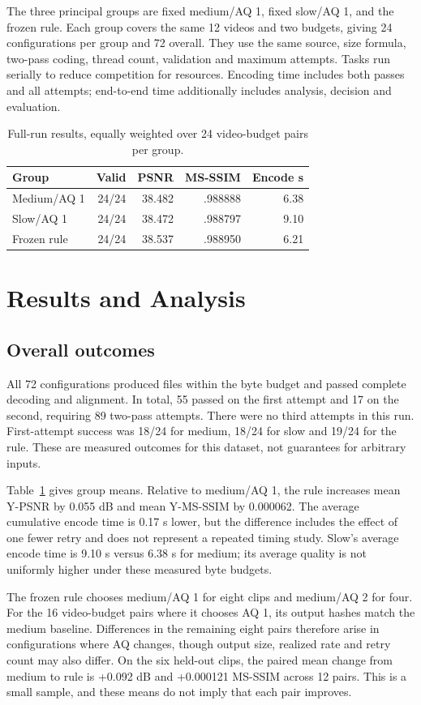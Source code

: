 \documentclass[conference]{IEEEtran}
\begin{document}
The three principal groups are fixed medium/AQ 1, fixed slow/AQ 1, and the frozen rule. Each group covers the same 12 videos and two budgets, giving 24 configurations per group and 72 overall. They use the same source, size formula, two-pass coding, thread count, validation and maximum attempts. Tasks run serially to reduce competition for resources. Encoding time includes both passes and all attempts; end-to-end time additionally includes analysis, decision and evaluation.
\begin{table}[H]\centering\caption{Full-run results, equally weighted over 24 video-budget pairs per group.}\label{tab:summary}
\begin{tabular}{lrrrr}\toprule
Group & Valid & PSNR & MS-SSIM & Encode s\\\midrule
Medium/AQ 1 & 24/24 & 38.482 & .988888 & 6.38\\
Slow/AQ 1 & 24/24 & 38.472 & .988797 & 9.10\\
Frozen rule & 24/24 & 38.537 & .988950 & 6.21\\\bottomrule
\end{tabular}\end{table}
\section{Results and Analysis}
\subsection{Overall outcomes}
All 72 configurations produced files within the byte budget and passed complete decoding and alignment. In total, 55 passed on the first attempt and 17 on the second, requiring 89 two-pass attempts. There were no third attempts in this run. First-attempt success was 18/24 for medium, 18/24 for slow and 19/24 for the rule. These are measured outcomes for this dataset, not guarantees for arbitrary inputs.

Table~\ref{tab:summary} gives group means. Relative to medium/AQ 1, the rule increases mean Y-PSNR by 0.055 dB and mean Y-MS-SSIM by 0.000062. The average cumulative encode time is 0.17 s lower, but the difference includes the effect of one fewer retry and does not represent a repeated timing study. Slow's average encode time is 9.10 s versus 6.38 s for medium; its average quality is not uniformly higher under these measured byte budgets.

The frozen rule chooses medium/AQ 1 for eight clips and medium/AQ 2 for four. For the 16 video-budget pairs where it chooses AQ 1, its output hashes match the medium baseline. Differences in the remaining eight pairs therefore arise in configurations where AQ changes, though output size, realized rate and retry count may also differ. On the six held-out clips, the paired mean change from medium to rule is +0.092 dB and +0.000121 MS-SSIM across 12 pairs. This is a small sample, and these means do not imply that each pair improves.
\end{document}
